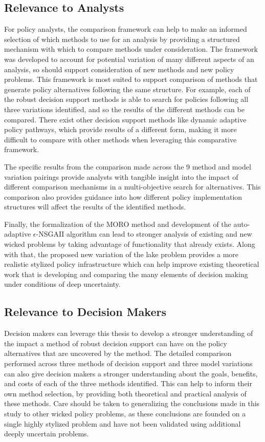     \subsection{Relevance to Analysts}
    For policy analysts, the comparison framework can help to make an informed selection of which methods to use for an analysis by providing a structured mechanism with which to compare methods under consideration. The framework was developed to account for potential variation of many different aspects of an analysis, so should support consideration of new methods and new policy problems. This framework is most suited to support comparison of methods that generate policy alternatives following the same structure. For example, each of the robust decision support methods is able to search for policies following all three variations identified, and so the results of the different methods can be compared. There exist other decision support methods like dynamic adaptive policy pathways, which provide results of a different form, making it more difficult to compare with other methods when leveraging this comparative framework. 
    
    The specific results from the comparison made across the 9 method and model variation pairings provide analysts with tangible insight into the impact of different comparison mechanisms in a multi-objective search for alternatives. This comparison also provides guidance into how different policy implementation structures will affect the results of the identified methods. 
    
    Finally, the formalization of the MORO method and development of the auto-adaptive $\epsilon$-NSGAII algorithm can lead to stronger analysis of existing and new wicked problems by taking advantage of functionality that already exists. Along with that, the proposed new variation of the lake problem provides a more realistic stylized policy infrastructure which can help improve existing theoretical work that is developing and comparing the many elements of decision making under conditions of deep uncertainty. 
        
    \subsection{Relevance to Decision Makers}
    Decision makers can leverage this thesis to develop a stronger understanding of the impact a method of robust decision support can have on the policy alternatives that are uncovered by the method. The detailed comparison performed across three methods of decision support and three model variations can also give decision makers a stronger understanding about the goals, benefits, and costs of each of the three methods identified. This can help to inform their own method selection, by providing both theoretical and practical analysis of these methods. Care should be taken to generalizing the conclusions made in this study to other wicked policy problems, as these conclusions are founded on a single highly stylized problem and have not been validated using additional deeply uncertain problems. 
    
